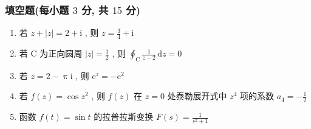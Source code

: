 \documentclass[cn,11pt,fancy,hide]{elegantbook}
\newcommand{\ee}{\mathrm{e}}
\newcommand{\dd}{\,\mathrm{d}}
\newcommand{\ii}{\mathrm{i}}
\begin{document}
\subsubsection{填空题(每小题 $3$ 分, 共 $15$ 分)}
\begin{enumerate}
	\item 若 $z+|z|=2+\ii$ , 则 $z=$\underline{\hspace{1pc}$\frac{3}{4}+\ii$\hspace{1pc}}
	
	\item 若 $\mathrm{C}$ 为正向圆周 $|z|=\frac{1}{2}$ , 则 $\oint_{\mathrm{C}} \frac{1}{z-2} \dd z=$\underline{\hspace{1pc}$0$\hspace{1pc}}
	
	\item 若 $z=2-\uppi\ii$ , 则 $\ee^{z}=$\underline{\hspace{1pc}$-\ee^2$\hspace{1pc}}
	
	\item 若 $f(z)=\cos z^2$ , 则 $f(z)$ 在 $z=0$ 处泰勒展开式中 $z^4$ 项的系数 $a_4=$\underline{\hspace{1pc}$-\frac{1}{2}$\hspace{1pc}}
	
	\item 函数 $f(t)=\sin t$ 的拉普拉斯变换 $F(s)=$\underline{\hspace{1pc}$\frac{1}{s^2+1}$\hspace{1pc}}
\end{enumerate}
\end{document}
